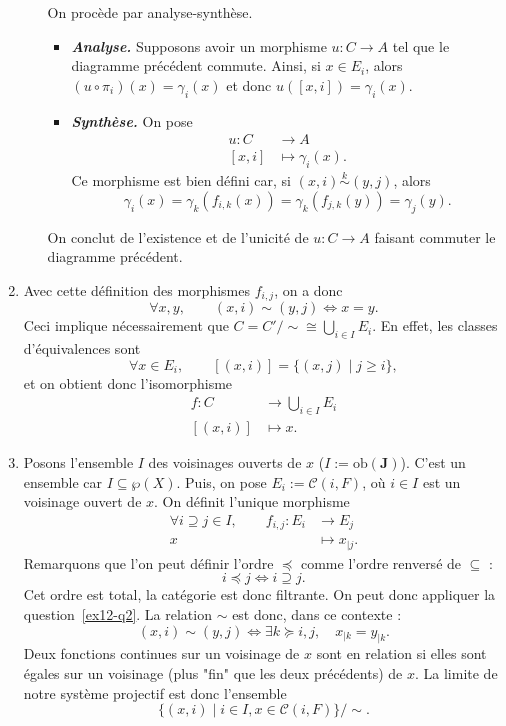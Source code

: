 \documentclass{../../td}
\begin{document}
\begin{enumerate}
\begin{enumerate}
          On procède par analyse-synthèse.
          \begin{itemize}
            \item \textbf{\textsl{\color{deepblue}Analyse.}}
              Supposons avoir un morphisme $u : C \to A$ tel que le diagramme précédent commute.
              Ainsi, si $x \in E_i$, alors $(u \circ \pi_i)(x) = \gamma_i(x)$ et donc $u([x,i]) = \gamma_i(x)$.
            \item \textbf{\textsl{\color{deepblue}Synthèse.}}
              On pose \begin{align*}
                u: C &\longrightarrow A \\
                [x,i] &\longmapsto \gamma_i(x)
              .\end{align*}
              Ce morphisme est bien défini car, si $(x,i) \overset k \sim (y,j)$, alors \[
              \gamma_i(x) = \gamma_k(f_{i,k}(x)) = \gamma_k(f_{j,k}(y)) = \gamma_j(y)
              .\]
          \end{itemize}
          On conclut de l'existence et de l'unicité de $u : C \to A$ faisant commuter le diagramme précédent.
      \end{enumerate}
    \item Avec cette définition des morphismes $f_{i,j}$, on a donc \[
      \forall x,y, \quad\quad (x,i) \sim (y,j) \iff x = y
      .\]
      Ceci implique nécessairement que $C = C' / {\sim} \cong \bigcup_{i \in I} E_i$. En effet, les classes d'équivalences sont \[
        \forall x \in E_i, \quad\quad [(x,i)] = \{(x,j)  \mid j \ge i\} 
      ,\]et on obtient donc l'isomorphisme \begin{align*}
        f: C &\longrightarrow \bigcup_{i \in  I} E_i \\
        [(x,i)] &\longmapsto x
      .\end{align*}
    \item Posons l'ensemble $I$ des voisinages ouverts de $x$ ($I := \mathrm{ob}(\mathbf{J})$).
      C'est un ensemble car $I\subseteq \wp(X)$.
      Puis, on pose $E_i := \mathcal{C}(i, F)$, où $i \in I$ est un voisinage ouvert de $x$.
      On définit l'unique morphisme \begin{align*}
        \forall i \supseteq j \in I, \quad\quad
       f_{i,j} : E_i &\longrightarrow E_j \\
        x &\longmapsto x_{|j}
      .\end{align*}
      Remarquons que l'on peut définir l'ordre $\preceq$ comme l'ordre renversé de $\subseteq$ : \[
      i \preceq j \iff i \supseteq j
      .\]
      Cet ordre est total, la catégorie est donc filtrante.
      On peut donc appliquer la question~\ref{ex12-q2}.
      La relation $\sim$ est donc, dans ce contexte : \[
        (x,i) \sim (y,j) \iff \exists k \succeq i,j, \quad x_{|k} = y_{|k}
      .\]
      Deux fonctions continues sur un voisinage de $x$ sont en relation si elles sont égales sur un voisinage (plus "fin" que les deux précédents) de $x$.
      La limite de notre système projectif est donc l'ensemble \[
        \{(x,i)  \mid i \in I, x \in \mathcal{C}(i, F)\} / {\sim}
      .\] 
  \end{enumerate}
\end{document}
